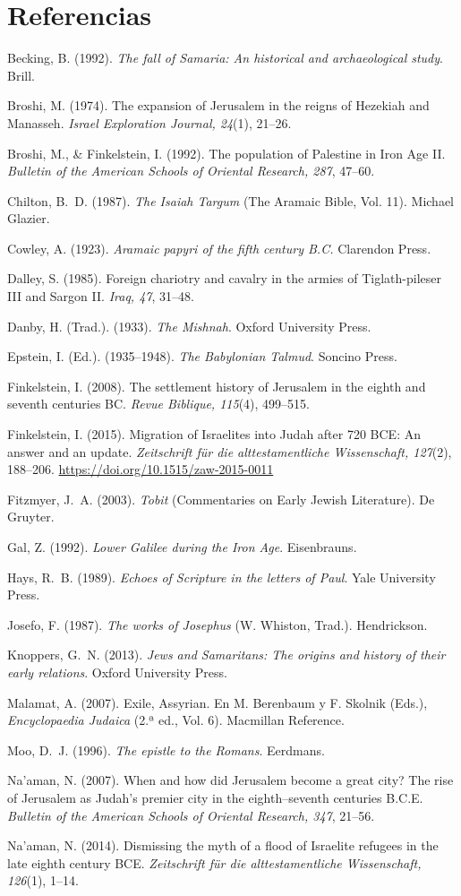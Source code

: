 \documentclass[11pt,letterpaper]{article}
\newcommand{\refapa}[1]{\par{\RaggedRight\hangindent=1.27cm\hangafter=1\noindent #1\par}\vspace{4pt}}
\begin{document}
\section*{Referencias}
\refapa{Becking, B. (1992). \emph{The fall of Samaria: An historical and archaeological study}. Brill.}
\refapa{Broshi, M. (1974). The expansion of Jerusalem in the reigns of Hezekiah and Manasseh. \emph{Israel Exploration Journal, 24}(1), 21--26.}
\refapa{Broshi, M., \& Finkelstein, I. (1992). The population of Palestine in Iron Age II. \emph{Bulletin of the American Schools of Oriental Research, 287}, 47--60.}
\refapa{Chilton, B.~D. (1987). \emph{The Isaiah Targum} (The Aramaic Bible, Vol. 11). Michael Glazier.}
\refapa{Cowley, A. (1923). \emph{Aramaic papyri of the fifth century B.C.} Clarendon Press.}
\refapa{Dalley, S. (1985). Foreign chariotry and cavalry in the armies of Tiglath-pileser III and Sargon II. \emph{Iraq, 47}, 31--48.}
\refapa{Danby, H. (Trad.). (1933). \emph{The Mishnah}. Oxford University Press.}
\refapa{Epstein, I. (Ed.). (1935--1948). \emph{The Babylonian Talmud}. Soncino Press.}
\refapa{Finkelstein, I. (2008). The settlement history of Jerusalem in the eighth and seventh centuries BC. \emph{Revue Biblique, 115}(4), 499--515.}
\refapa{Finkelstein, I. (2015). Migration of Israelites into Judah after 720 BCE: An answer and an update. \emph{Zeitschrift für die alttestamentliche Wissenschaft, 127}(2), 188--206. \url{https://doi.org/10.1515/zaw-2015-0011}}
\refapa{Fitzmyer, J.~A. (2003). \emph{Tobit} (Commentaries on Early Jewish Literature). De Gruyter.}
\refapa{Gal, Z. (1992). \emph{Lower Galilee during the Iron Age}. Eisenbrauns.}
\refapa{Hays, R.~B. (1989). \emph{Echoes of Scripture in the letters of Paul}. Yale University Press.}
\refapa{Josefo, F. (1987). \emph{The works of Josephus} (W. Whiston, Trad.). Hendrickson.}
\refapa{Knoppers, G.~N. (2013). \emph{Jews and Samaritans: The origins and history of their early relations}. Oxford University Press.}
\refapa{Malamat, A. (2007). Exile, Assyrian. En M. Berenbaum y F. Skolnik (Eds.), \emph{Encyclopaedia Judaica} (2.ª ed., Vol. 6). Macmillan Reference.}
\refapa{Moo, D.~J. (1996). \emph{The epistle to the Romans}. Eerdmans.}
\refapa{Na'aman, N. (2007). When and how did Jerusalem become a great city? The rise of Jerusalem as Judah's premier city in the eighth--seventh centuries B.C.E. \emph{Bulletin of the American Schools of Oriental Research, 347}, 21--56.}
\refapa{Na'aman, N. (2014). Dismissing the myth of a flood of Israelite refugees in the late eighth century BCE. \emph{Zeitschrift für die alttestamentliche Wissenschaft, 126}(1), 1--14.}
\end{document}
